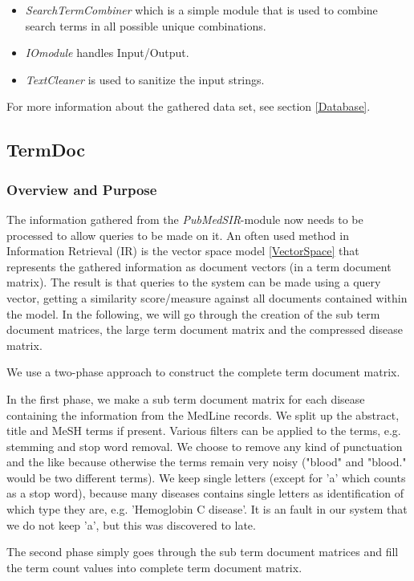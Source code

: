 \begin{itemize}
\item \textit{SearchTermCombiner} which is a simple module that is
  used to combine search terms in all possible unique
  combinations.
\item \textit{IOmodule} handles Input/Output.
\item \textit{TextCleaner} is used to sanitize the input strings.
\end{itemize}

For more information about the gathered data set, see section \ref{Database}.

\subsection{TermDoc\label{TermDoc}}

\subsubsection{Overview and Purpose}
The information gathered from the \textit{PubMedSIR}-module now needs
to be processed to allow queries to be made on it. An often used
method in Information Retrieval (IR) is the vector space model
\ref{VectorSpace} that represents the gathered information as document
vectors (in a term document matrix). The result is that queries to the
system can be made using a query vector, getting a similarity
score/measure against all documents contained within the model. In the
following, we will go through the creation of the sub term document
matrices, the large term document matrix and the compressed disease
matrix.

We use a two-phase approach to construct the complete term document
matrix.

In the first phase, we make a sub term document matrix for each
disease containing the information from the MedLine records. We split
up the abstract, title and MeSH terms if present. Various filters can
be applied to the terms, e.g. stemming and stop word removal. We
choose to remove any kind of punctuation and the like because
otherwise the terms remain very noisy ("blood" and "blood." would be
two different terms). We keep single letters (except for 'a' which
counts as a stop word), because many diseases contains single letters
as identification of which type they are, e.g. 'Hemoglobin C
disease'. It is an fault in our system that we do not keep 'a', but
this was discovered to late.

The second phase simply goes through the sub term document matrices
and fill the term count values into complete term document matrix.

